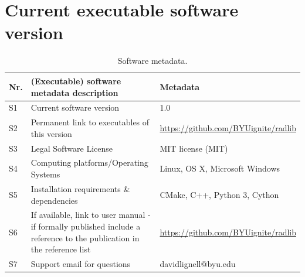 \documentclass[preprint,12pt, a4paper]{elsarticle}
\begin{document}
 
 


\section*{Current executable software version} \label{s:current_software}


\begin{table}[!ht]
\begin{tabular}{|l|p{6.5cm}|p{6.5cm}|}
\hline
\textbf{Nr.} & \textbf{(Executable) software metadata description} & \textbf{Metadata} \\
\hline
S1 & Current software version & 1.0 \\
\hline
S2 & Permanent link to executables of this version  & \href{https://github.com/BYUignite/radlib}{https://github.com/BYUignite/radlib} \\
\hline
S3 & Legal Software License & MIT license (MIT) \\
\hline
S4 & Computing platforms/Operating Systems & Linux, OS X, Microsoft Windows\\
\hline
S5 & Installation requirements \& dependencies & CMake, C++, Python 3, Cython \\
\hline
S6 & If available, link to user manual - if formally published include a reference to the publication in the reference
    list & \href{https://github.com/BYUignite/radlib}{https://github.com/BYUignite/radlib} \\
\hline
S7 & Support email for questions & davidlignell@byu.edu \\
\hline
\end{tabular}
\caption{Software metadata.}
\label{t:softmd} 
\end{table}
\end{document}
